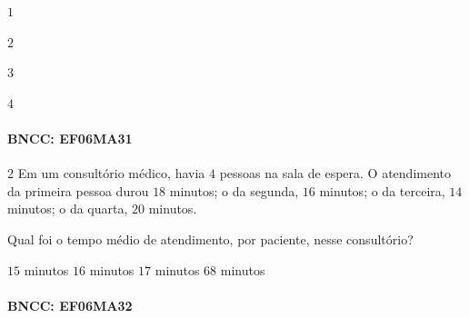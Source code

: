 \begin{escolha}
\item $1$
\item $2$
\item $3$
\item $4$
\end{escolha}

\paragraph{BNCC: EF06MA31 }


\num{2}  Em um consultório médico, havia $4$ pessoas na sala de espera. O
atendimento da primeira pessoa durou $18$ minutos; o da segunda, $16$
minutos; o da terceira, $14$ minutos; o da quarta, $20$ minutos.

Qual foi o tempo médio de atendimento, por paciente, nesse consultório?

\begin{boxlist}
\boxitem[] $15$ minutos
\boxitem[] $16$ minutos
\boxitem[] $17$ minutos
\boxitem[] $68$ minutos
\end{boxlist}

\paragraph{BNCC: EF06MA32 }

